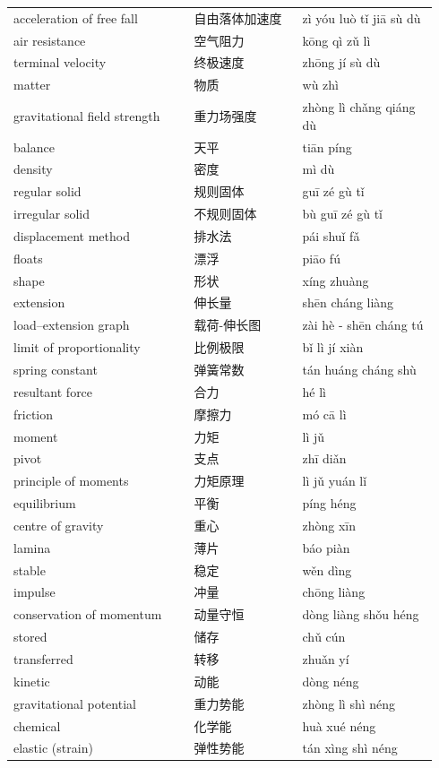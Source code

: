 \documentclass[11pt]{article}
\begin{document}
\begin{longtable}{@{}p{0.40\linewidth}p{0.24\linewidth}p{0.30\linewidth}@{}}
acceleration of free fall & 自由落体加速度 & zì yóu luò tǐ jiā sù dù \\
air resistance & 空气阻力 & kōng qì zǔ lì \\
terminal velocity & 终极速度 & zhōng jí sù dù \\
matter & 物质 & wù zhì \\
gravitational field strength & 重力场强度 & zhòng lì chǎng qiáng dù \\
balance & 天平 & tiān píng \\
density & 密度 & mì dù \\
regular solid & 规则固体 & guī zé gù tǐ \\
irregular solid & 不规则固体 & bù guī zé gù tǐ \\
displacement method & 排水法 & pái shuǐ fǎ \\
floats & 漂浮 & piāo fú \\
shape & 形状 & xíng zhuàng \\
extension & 伸长量 & shēn cháng liàng \\
load–extension graph & 载荷-伸长图 & zài hè - shēn cháng tú \\
limit of proportionality & 比例极限 & bǐ lì jí xiàn \\
spring constant & 弹簧常数 & tán huáng cháng shù \\
resultant force & 合力 & hé lì \\
friction & 摩擦力 & mó cā lì \\
moment & 力矩 & lì jǔ \\
pivot & 支点 & zhī diǎn \\
principle of moments & 力矩原理 & lì jǔ yuán lǐ \\
equilibrium & 平衡 & píng héng \\
centre of gravity & 重心 & zhòng xīn \\
lamina & 薄片 & báo piàn \\
stable & 稳定 & wěn dìng \\
impulse & 冲量 & chōng liàng \\
conservation of momentum & 动量守恒 & dòng liàng shǒu héng \\
stored & 储存 & chǔ cún \\
transferred & 转移 & zhuǎn yí \\
kinetic & 动能 & dòng néng \\
gravitational potential & 重力势能 & zhòng lì shì néng \\
chemical & 化学能 & huà xué néng \\
elastic (strain) & 弹性势能 & tán xìng shì néng \\

\end{longtable}
\end{document}
